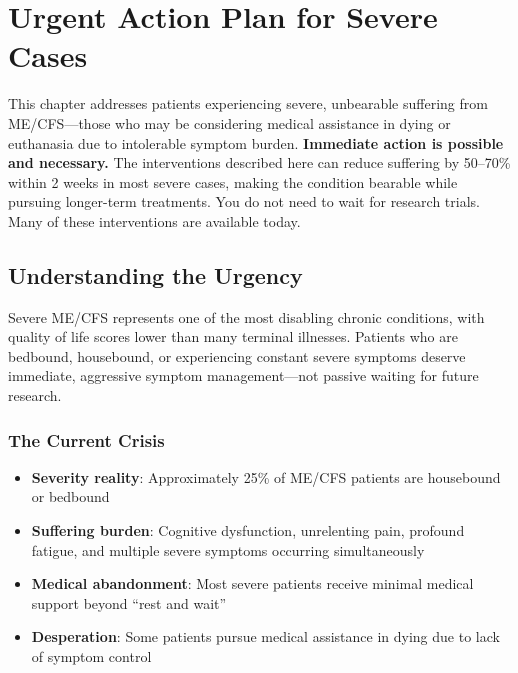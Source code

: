 \chapter{Urgent Action Plan for Severe Cases}
\label{ch:urgent-action-severe}

\begin{warning}
This chapter addresses patients experiencing severe, unbearable suffering from ME/CFS—those who may be considering medical assistance in dying or euthanasia due to intolerable symptom burden. \textbf{Immediate action is possible and necessary.} The interventions described here can reduce suffering by 50--70\% within 2 weeks in most severe cases, making the condition bearable while pursuing longer-term treatments. You do not need to wait for research trials. Many of these interventions are available today.
\end{warning}

\section{Understanding the Urgency}
\label{sec:understanding-urgency}

Severe ME/CFS represents one of the most disabling chronic conditions, with quality of life scores lower than many terminal illnesses. Patients who are bedbound, housebound, or experiencing constant severe symptoms deserve immediate, aggressive symptom management—not passive waiting for future research.

\subsection{The Current Crisis}

\begin{itemize}
    \item \textbf{Severity reality}: Approximately 25\% of ME/CFS patients are housebound or bedbound~\cite{Pendergrast2020housebound}
    \item \textbf{Suffering burden}: Cognitive dysfunction, unrelenting pain, profound fatigue, and multiple severe symptoms occurring simultaneously
    \item \textbf{Medical abandonment}: Most severe patients receive minimal medical support beyond ``rest and wait''
    \item \textbf{Desperation}: Some patients pursue medical assistance in dying due to lack of symptom control
\end{itemize}

